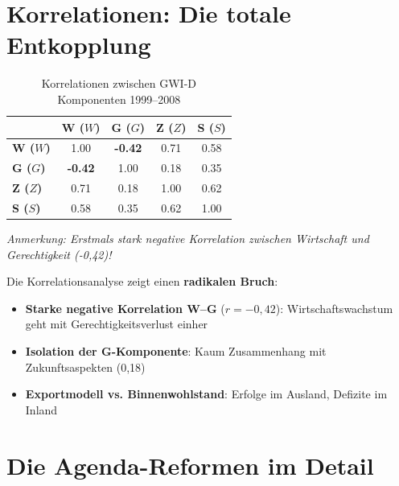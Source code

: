 \section{Korrelationen: Die totale Entkopplung}

\begin{table}[ht]
    \centering
    \caption{Korrelationen zwischen GWI-D Komponenten 1999–2008}
    \label{tab:korrelation_agenda}
    \begin{tabular}{lcccc}
        \toprule
        & \textbf{W (\(W\))} & \textbf{G (\(G\))} & \textbf{Z (\(Z\))} & \textbf{S (\(S\))} \\
        \midrule
        \textbf{W (\(W\))} & 1.00 & \textbf{-0.42} & 0.71 & 0.58 \\
        \textbf{G (\(G\))} & \textbf{-0.42} & 1.00 & 0.18 & 0.35 \\
        \textbf{Z (\(Z\))} & 0.71 & 0.18 & 1.00 & 0.62 \\
        \textbf{S (\(S\))} & 0.58 & 0.35 & 0.62 & 1.00 \\
        \bottomrule
    \end{tabular}
\end{table}

\begin{flushleft}
\footnotesize{\textit{Anmerkung: Erstmals stark negative Korrelation zwischen Wirtschaft und Gerechtigkeit (-0,42)!}}
\end{flushleft}

Die Korrelationsanalyse zeigt einen \textbf{radikalen Bruch}:

\begin{itemize}
    \item \textbf{Starke negative Korrelation W–G} (\(r = -0,42\)): Wirtschaftswachstum geht mit Gerechtigkeitsverlust einher
    \item \textbf{Isolation der G-Komponente}: Kaum Zusammenhang mit Zukunftsaspekten (0,18)
    \item \textbf{Exportmodell vs. Binnenwohlstand}: Erfolge im Ausland, Defizite im Inland
\end{itemize}

\section{Die Agenda-Reformen im Detail}

